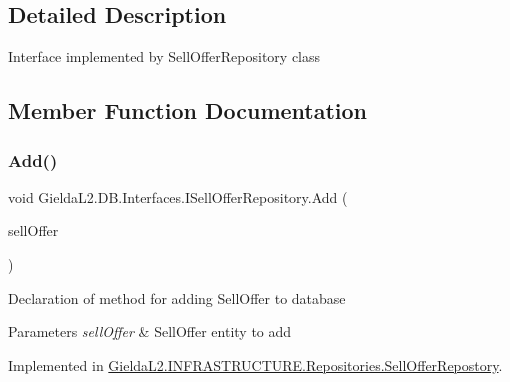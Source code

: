 \subsection{Detailed Description}
Interface implemented by Sell\+Offer\+Repository class 



\subsection{Member Function Documentation}
\mbox{\label{interface_gielda_l2_1_1_d_b_1_1_interfaces_1_1_i_sell_offer_repository_a18f7f7c3a677e89bdc055a6b4a6a248a}} 
\subsubsection{\texorpdfstring{Add()}{Add()}}
{\footnotesize\ttfamily void Gielda\+L2.\+D\+B.\+Interfaces.\+I\+Sell\+Offer\+Repository.\+Add (\begin{DoxyParamCaption}\item[{\mbox{\hyperlink{class_gielda_l2_1_1_d_b_1_1_entities_1_1_sell_offer}{Sell\+Offer}}}]{sell\+Offer }\end{DoxyParamCaption})}



Declaration of method for adding Sell\+Offer to database 


\begin{DoxyParams}{Parameters}
{\em sell\+Offer} & Sell\+Offer entity to add\\
\hline
\end{DoxyParams}


Implemented in \mbox{\hyperlink{class_gielda_l2_1_1_i_n_f_r_a_s_t_r_u_c_t_u_r_e_1_1_repositories_1_1_sell_offer_repostory_a9998a9883c5ae73fb854eeff44075e73}{Gielda\+L2.\+I\+N\+F\+R\+A\+S\+T\+R\+U\+C\+T\+U\+R\+E.\+Repositories.\+Sell\+Offer\+Repostory}}.

\mbox{\label{interface_gielda_l2_1_1_d_b_1_1_interfaces_1_1_i_sell_offer_repository_a9d5a9662923804caeedb86878a8635f7}} 
